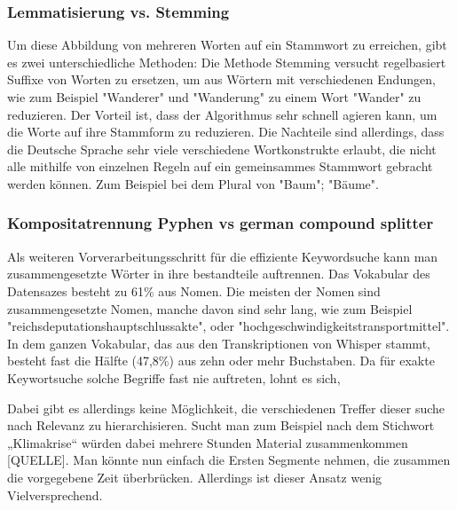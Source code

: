 \subsubsection{Lemmatisierung vs. Stemming}

Um diese Abbildung von mehreren Worten auf ein Stammwort zu erreichen, gibt es zwei unterschiedliche Methoden:
Die Methode Stemming versucht regelbasiert Suffixe von Worten zu ersetzen, um aus Wörtern mit verschiedenen Endungen, wie zum Beispiel "Wanderer" und "Wanderung" zu einem Wort "Wander" zu reduzieren.
Der Vorteil ist, dass der Algorithmus sehr schnell agieren kann, um die Worte auf ihre Stammform zu reduzieren.
Die Nachteile sind allerdings, dass die Deutsche Sprache sehr viele verschiedene Wortkonstrukte erlaubt, die nicht alle mithilfe von einzelnen Regeln auf ein gemeinsammes Stammwort gebracht werden können. 
Zum Beispiel bei dem Plural von "Baum"; "Bäume".


\subsubsection{Kompositatrennung Pyphen vs german compound splitter}

Als weiteren Vorverarbeitungsschritt für die effiziente Keywordsuche kann man zusammengesetzte Wörter in ihre bestandteile auftrennen.
Das Vokabular des Datensazes besteht zu 61\% aus Nomen. 
Die meisten der Nomen sind zusammengesetzte Nomen, manche davon sind sehr lang, wie zum Beispiel "reichsdeputationshauptschlussakte", oder "hochgeschwindigkeitstransportmittel".
In dem ganzen Vokabular, das aus den Transkriptionen von Whisper stammt, besteht fast die Hälfte (47,8\%) aus zehn oder mehr Buchstaben.
Da für exakte Keywortsuche solche Begriffe fast nie auftreten, lohnt es sich, 



Dabei gibt es allerdings keine Möglichkeit, die verschiedenen Treffer dieser suche nach Relevanz zu hierarchisieren. Sucht man zum Beispiel nach dem Stichwort „Klimakrise“ würden dabei mehrere Stunden Material zusammenkommen [QUELLE]. 
Man könnte nun einfach die Ersten Segmente nehmen, die zusammen die vorgegebene Zeit überbrücken. 
Allerdings ist dieser Ansatz wenig Vielversprechend. 


